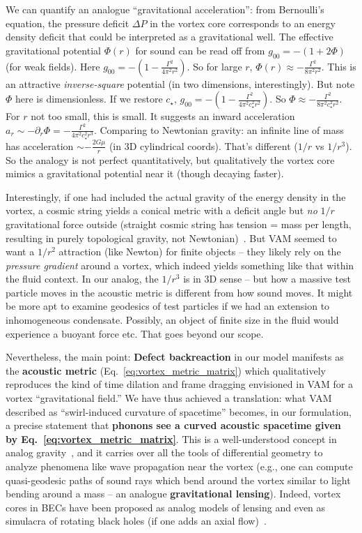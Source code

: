 \documentclass[12pt]{article}
\begin{document}
We can quantify an analogue ``gravitational acceleration'': from Bernoulli’s equation, the pressure deficit $\Delta P$ in the vortex core corresponds to an energy density deficit that could be interpreted as a gravitational well. The effective gravitational potential $\Phi(r)$ for sound can be read off from $g_{00} = -(1+2\Phi)$ (for weak fields). Here $g_{00} = -(1 - \frac{\Gamma^2}{4\pi^2r^2})$. So for large $r$, $\Phi(r) \approx -\frac{\Gamma^2}{8\pi^2 r^2}$. This is an attractive \textit{inverse-square} potential (in two dimensions, interestingly). But note $\Phi$ here is dimensionless. If we restore $c_\star$, $g_{00}=-(1 - \frac{\Gamma^2}{4\pi^2 c_\star^2 r^2})$. So $\Phi \approx -\frac{\Gamma^2}{8\pi^2 c_\star^2 r^2}$. For $r$ not too small, this is small. It suggests an inward acceleration $a_r \sim -\partial_r \Phi = -\frac{\Gamma^2}{4\pi^2 c_\star^2 r^3}$. Comparing to Newtonian gravity: an infinite line of mass has acceleration $\sim -\frac{2G\mu}{r}$ (in 3D cylindrical coords). That’s different ($1/r$ vs $1/r^3$). So the analogy is not perfect quantitatively, but qualitatively the vortex core mimics a gravitational potential near it (though decaying faster).

Interestingly, if one had included the actual gravity of the energy density in the vortex, a cosmic string yields a conical metric with a deficit angle but \textit{no} $1/r$ gravitational force outside (straight cosmic string has tension = mass per length, resulting in purely topological gravity, not Newtonian)~\cite{ref:vilenkin}. But VAM seemed to want a $1/r^2$ attraction (like Newton) for finite objects -- they likely rely on the \textit{pressure gradient} around a vortex, which indeed yields something like that within the fluid context. In our analog, the $1/r^3$ is in 3D sense -- but how a massive test particle moves in the acoustic metric is different from how sound moves. It might be more apt to examine geodesics of test particles if we had an extension to inhomogeneous condensate. Possibly, an object of finite size in the fluid would experience a buoyant force etc. That goes beyond our scope.

Nevertheless, the main point: \textbf{Defect backreaction} in our model manifests as the \textbf{acoustic metric} (Eq.~\eqref{eq:vortex_metric_matrix}) which qualitatively reproduces the kind of time dilation and frame dragging envisioned in VAM for a vortex ``gravitational field.'' We have thus achieved a translation: what VAM described as ``swirl-induced curvature of spacetime'' becomes, in our formulation, a precise statement that \textbf{phonons see a curved acoustic spacetime given by Eq.~\eqref{eq:vortex_metric_matrix}}. This is a well-understood concept in analog gravity~\cite{ref:volovik}, and it carries over all the tools of differential geometry to analyze phenomena like wave propagation near the vortex (e.g., one can compute quasi-geodesic paths of sound rays which bend around the vortex similar to light bending around a mass -- an analogue \textbf{gravitational lensing}). Indeed, vortex cores in BECs have been proposed as analog models of lensing and even as simulacra of rotating black holes (if one adds an axial flow)~\cite{ref:visser_string}.
\end{document}
